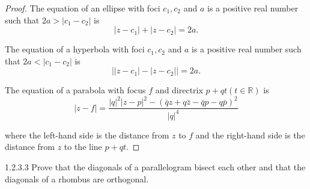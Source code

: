 \begin{proof}
	The equation of an ellipse with foci \( c_{1}, c_{2} \) and \( a \) is a positive real number such that \( 2a > \left\vert c_{1} - c_{2} \right\vert \) is
	\[
		\left\vert z - c_{1} \right\vert + \left\vert z - c_{2} \right\vert = 2a.
	\]

	The equation of a hyperbola with foci \( c_{1}, c_{2} \) and \( a \) is a positive real number such that \( 2a < \left\vert c_{1} - c_{2} \right\vert \) is
	\[
		\left\vert \left\vert z - c_{1} \right\vert - \left\vert z - c_{2} \right\vert \right\vert = 2a.
	\]

	The equation of a parabola with focus \( f \) and directrix \( p + qt (t \in \mathbb{R}) \) is
	\[
		\left\vert z - f \right\vert = \dfrac{{\left\vert q \right\vert}^{2} {\left\vert z - p \right\vert}^{2} - {(\bar{q}z + q\bar{z} - \bar{q}p - q\bar{p})}^{2}}{{\left\vert q \right\vert}^{4}}
	\]

	where the left-hand side is the distance from \( z \) to \( f \) and the right-hand side is the distance from \( z \) to the line \( p + qt \).
\end{proof}

\begin{problem}{1.2.3.3}
Prove that the diagonals of a parallelogram bisect each other and that the diagonals of a rhombus are orthogonal.
\end{problem}

